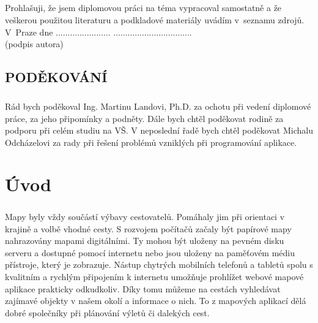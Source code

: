 \documentclass[11pt,a4paper,titlepage,oneside]{book}
\begin{document}
		\paragraph{}Prohlašuji, že jsem diplomovou práci na téma  vypracoval samostatně a že veškerou použitou literaturu a podkladové materiály uvádím v~seznamu zdrojů.\\[1cm]
	V~Praze dne ....................... ................................. \\
	 {(podpis autora)\hspace{0.25cm} }
	
\newpage %
	\vspace*{15cm}
	\section*{\Large PODĚKOVÁNÍ}
	\paragraph{} Rád bych poděkoval Ing. Martinu Landovi, Ph.D. za ochotu při vedení diplomové práce, za jeho připomínky a podněty. Dále bych chtěl poděkovat rodině za podporu při celém studiu na VŠ. V neposlední řadě bych chtěl poděkovat Michalu Odcházelovi za rady při řešení problémů vzniklých při programování aplikace.
		
\renewcommand{\baselinestretch}{1.5} %
\newpage %
\pagestyle{plain}
\setcounter{page}{5}

	\tableofcontents

\newpage %
	\listoffigures

\newpage %
\chapter*{Úvod}

	\paragraph{} Mapy byly vždy součástí výbavy cestovatelů. Pomáhaly jim při orientaci v krajině a volbě vhodné cesty. S rozvojem počítačů začaly být papírové mapy nahrazovány mapami digitálními. Ty mohou být uloženy na pevném disku serveru a dostupné pomocí internetu nebo jsou uloženy na paměťovém médiu přístroje, který je zobrazuje. Nástup chytrých mobilních telefonů a tabletů spolu s kvalitním a rychlým připojením k internetu umožňuje prohlížet webové mapové aplikace prakticky odkudkoliv. Díky tomu můžeme na cestách vyhledávat zajímavé objekty v našem okolí a informace o nich. To z mapových aplikací dělá dobré společníky při plánování výletů či dalekých cest.
\end{document}
